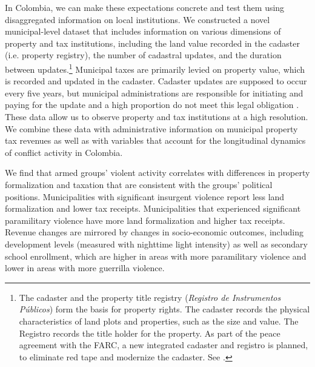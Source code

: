 In Colombia, we can make these expectations concrete and test them using disaggregated information on local institutions.  We constructed a novel municipal-level dataset that includes information on various dimensions of property and tax institutions, including the land value recorded in the cadaster (i.e. property registry), the number of cadastral updates, and the duration between updates.\footnote{The cadaster and the property title registry (\textit{Registro de Instrumentos P\'{u}blicos}) form the basis for property rights. The cadaster records the physical characteristics of land plots and properties, such as the size and value. The Registro records the title holder for the property. As part of the peace agreement with the FARC, a new integrated cadaster and registro is planned, to eliminate red tape and modernize the cadaster. See \citet{departamento-nacional-de-planeacion16a}.} Municipal taxes are primarily levied on property value, which is recorded and updated in the cadaster. Cadaster updates are supposed to occur every five years, but municipal administrations are responsible for initiating and paying for the update and a high proportion do not meet this legal obligation \citep{departamento-nacional-de-planeacion16a}. These data allow us to observe property and tax institutions at a high resolution. We combine these data with administrative information on municipal property tax revenues as well as with variables that account for the longitudinal dynamics of conflict activity in Colombia.

We find that armed groups' violent activity correlates with differences in property formalization and taxation that are consistent with the groups' political positions. Municipalities with significant insurgent violence report less land formalization and lower tax receipts. Municipalities that experienced significant paramilitary violence have more land formalization and higher tax receipts. Revenue changes are mirrored by changes in socio-economic outcomes, including development levels (measured with nighttime light intensity) as well as secondary school enrollment, which are higher in areas with more paramilitary violence and lower in areas with more guerrilla violence.

